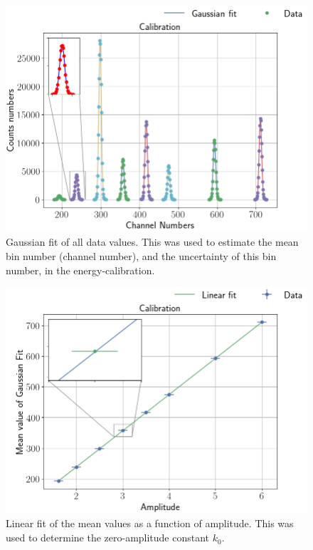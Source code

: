 \begin{figure}[h]
\centering
\includegraphics[width=0.99\columnwidth]{gaussian_fit}
\caption{Gaussian fit of all data values. This was used to estimate the mean
bin number (channel number), and the uncertainty of this bin number, in the
energy-calibration.}
\label{fig_gaussian_fit}
\end{figure}

\begin{figure}[h]
\centering
\includegraphics[width=0.99\columnwidth]{k0_plotting}
\caption{Linear fit of the mean values as a function of amplitude. This was
used to determine the zero-amplitude constant $k_0$.}
\label{fig_linear_fit}
\end{figure}

